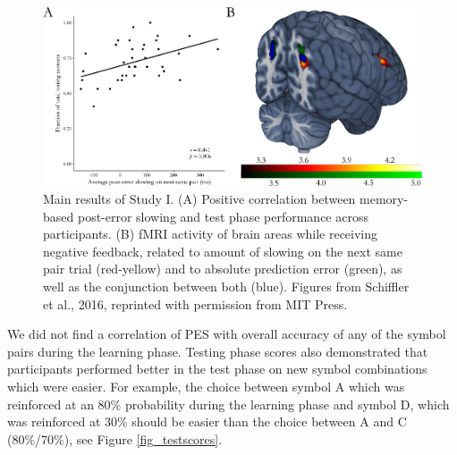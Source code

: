 \documentclass[12pt,openany]{book}
\theoremstyle{definition}
\theoremstyle{definition}
\theoremstyle{definition}
\theoremstyle{remark}
\begin{document}
\begin{figure}
  \centering
  \includegraphics{./figures/results_study1.pdf}
  \caption{Main results of Study I. (A) Positive correlation between memory-based post-error slowing and test phase performance across participants. (B) fMRI activity of brain areas while receiving negative feedback, related to amount of slowing on the next same pair trial (red-yellow) and to absolute prediction error (green), as well as the conjunction between both (blue). Figures from Schiffler et al., 2016, reprinted with permission from MIT Press.\label{fig_results_study1}}
\end{figure}

We did not find a correlation of PES with overall accuracy of any of the
symbol pairs during the learning phase. Testing phase scores also
demonstrated that participants performed better in the test phase on new
symbol combinations which were easier. For example, the choice between
symbol A which was reinforced at an 80\% probability during the learning
phase and symbol D, which was reinforced at 30\% should be easier than
the choice between A and C (80\%/70\%), see Figure \ref{fig_testscores}.
\end{document}
